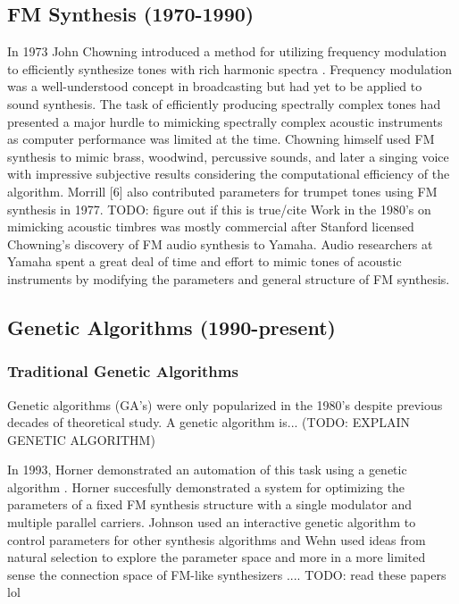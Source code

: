 \documentclass[12pt]{article}
\begin{document}
\subsection{FM Synthesis (1970-1990)}
In 1973 John Chowning introduced a method for utilizing frequency modulation to efficiently synthesize tones with rich harmonic spectra \citep{chowning1973synthesis}. Frequency modulation was a well-understood concept in broadcasting but had yet to be applied to sound synthesis. The task of efficiently producing spectrally complex tones had presented a major hurdle to mimicking spectrally complex acoustic instruments as computer performance was limited at the time. Chowning himself used FM synthesis to mimic brass, woodwind, percussive sounds, and later a singing voice \citep{chowning1989frequency} with impressive subjective results considering the computational efficiency of the algorithm. Morrill [6] also contributed parameters for trumpet tones using FM synthesis in 1977. TODO: figure out if this is true/cite
Work in the 1980's on mimicking acoustic timbres was mostly commercial after Stanford licensed Chowning's discovery of FM audio synthesis to Yamaha. Audio researchers at Yamaha spent a great deal of time and effort to mimic tones of acoustic instruments by modifying the parameters and general structure of FM synthesis.

\subsection{Genetic Algorithms (1990-present)}
\subsubsection{Traditional Genetic Algorithms}
Genetic algorithms (GA's) were only popularized in the 1980's despite previous decades of theoretical study. A genetic algorithm is... (TODO: EXPLAIN GENETIC ALGORITHM)

In 1993, Horner demonstrated an automation of this task using a genetic algorithm \citep{horner1993machine}. Horner succesfully demonstrated a system for optimizing the parameters of a fixed FM synthesis structure with a single modulator and multiple parallel carriers. Johnson used an interactive genetic algorithm to control parameters for other synthesis algorithms \citep{johnson1999exploring} and Wehn used ideas from natural selection to explore the parameter space and more in a more limited sense the connection space of FM-like synthesizers \citep{wehn1998using}.... TODO: read these papers lol
\end{document}
